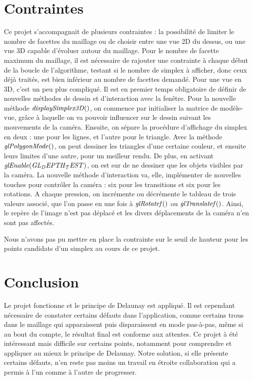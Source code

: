 \documentclass[10pt,a4paper]{report}
\begin{document}
\chapter{Contraintes}

\hspace*{10mm}Ce projet s'accompagnait de plusieurs contraintes : la possibilité de limiter le nombre de facettes du maillage ou de choisir entre une vue 2D du dessus, ou une vue 3D capable d'évoluer autour du maillage.
Pour le nombre de facette maximum du maillage, il est nécessaire de rajouter une contrainte à chaque début de la boucle de l'algorithme, testant si le nombre de simplex à afficher, donc ceux déjà traités, est bien inférieur au nombre de facettes demandé.\newline
Pour une vue en 3D, c'est un peu plus compliqué. Il est en premier temps obligatoire de définir de nouvelles méthodes de dessin et d'interaction avec la fenêtre.\newline 
Pour la nouvelle méthode $\it{displaySimplex3D()}$, on commence par initialiser la matrice de modèle-vue, grâce à laquelle on va pouvoir influencer sur le dessin suivant les mouvements de la caméra. Ensuite, on sépare la procédure d'affichage du simplex en deux : une pour les lignes, et l'autre pour le triangle.\newline 
Avec la méthode $\it{glPolygonMode()}$, on peut dessiner les triangles d'une certaine couleur, et ensuite leurs limites d'une autre, pour un meilleur rendu. De plus, en activant $\it{glEnable(GL_DEPTH_TEST)}$, on est sur de ne dessiner que les objets visibles par la caméra. \newline
La nouvelle méthode d'interaction va, elle, implémenter de nouvelles touches pour contrôler la caméra : six pour les transitions et six pour les rotations. \newline
A chaque pression, on incrémente ou décrémente le tableau de trois valeurs associé, que l'on passe en une fois à $\it{glRotatef()}$ ou $\it{glTranslatef()}$. Ainsi, le repère de l'image n'est pas déplacé et les divers déplacements de la caméra n'en sont pas affectés. \newline


Nous n'avons pas pu mettre en place la contrainte sur le seuil de hauteur pour les points candidats d'un simplex au cours de ce projet.

\chapter{Conclusion}
	\hspace*{10mm}Le projet fonctionne et le principe de Delaunay est appliqué. Il est cependant nécessaire de constater certains défauts dans l'application, comme certains trous dans le maillage qui apparaissent puis disparaissent en mode pas-à-pas, même si au bout du compte, le résultat final est conforme aux attentes. Ce projet à été intéressant mais difficile sur certains points, notamment pour comprendre et appliquer au mieux le principe de Delaunay. \newline
Notre solution, si elle présente certains défauts, n'en reste pas moins un travail en étroite collaboration qui a permis à l'un comme à l'autre de progresser.
\end{document}
